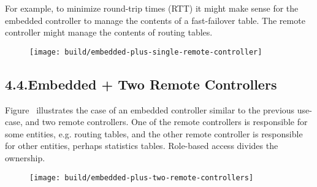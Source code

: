 \documentclass[11pt]{article}
\begin{document}
{%
For example, to minimize round-trip times (RTT) it might make sense for the
embedded controller to manage the contents of a fast-failover table. The remote
controller might manage the contents of routing tables.%

\begin{figure}[tbp]%
\begin{mdcenter}%

\noindent{}\texttt{[image: build/embedded-plus-single-remote-controller]}{}%

\mdhr{}%

\noindent{}%
\end{mdcenter}\label{fig-embedded-plus-single-remote-controller}%
\end{figure}%

\subsection{4.4.\hspace*{0.5em}Embedded + Two Remote Controllers}\label{sec-embedded-two-remote-controllers}%

\noindent{}Figure~ illustrates the case of an
embedded controller similar to the previous use-case, and two remote
controllers. One of the remote controllers is responsible for some entities,
e.g. routing tables, and the other remote controller is responsible for other
entities, perhaps statistics tables. Role-based access divides the ownership.%

\begin{figure}[tbp]%
\begin{mdcenter}%

\noindent{}\texttt{[image: build/embedded-plus-two-remote-controllers]}{}%

\mdhr{}%

\noindent{}%
\end{mdcenter}\label{fig-embedded-plus-two-remote-controllers}%
\end{figure}%

}
\end{document}
